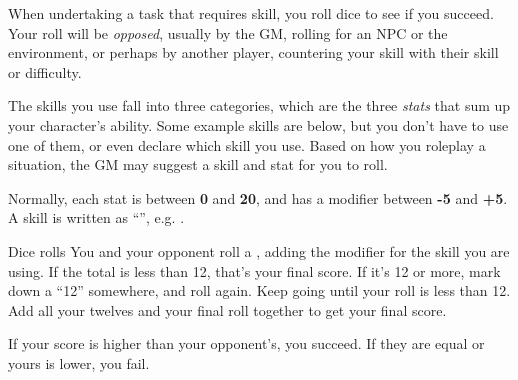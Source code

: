 
When undertaking a task that requires skill, you roll dice to see if you succeed. Your roll will be \emph{opposed}, usually by the GM, rolling for an NPC or the environment, or perhaps by another player, countering your skill with their skill or difficulty.

The skills you use fall into three categories, which are the three \emph{stats} that sum up your character's ability. Some example skills are below, but you don't have to use one of them, or even declare which skill you use. Based on how you roleplay a situation, the GM may suggest a skill and stat for you to roll.



Normally, each stat is between \textbf{0} and \textbf{20}, and has a modifier between \textbf{-5} and \textbf{+5}. A skill is written as ``'', e.g. .

\begin{abstractsection}{Dice rolls}
You and your opponent roll a , adding the modifier for the skill you are using. If the total is less than 12, that's your final score. If it's 12 or more, mark down a ``12'' somewhere, and roll again. Keep going until your roll is less than 12. Add all your twelves and your final roll together to get your final score.

If your score is higher than your opponent's, you succeed. If they are equal or yours is lower, you fail.
\end{abstractsection}
